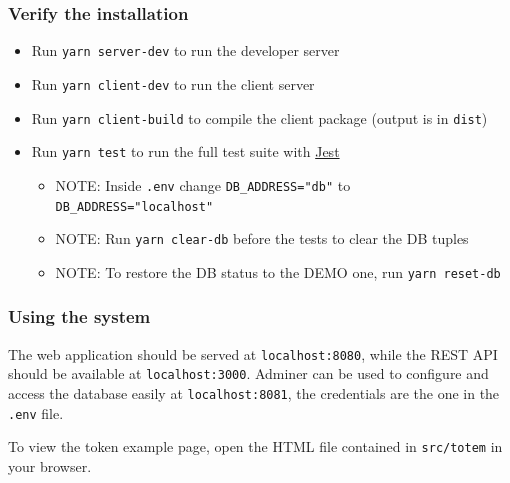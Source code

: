 \documentclass[
]{article}
\begin{document}
\hypertarget{verify-the-installation}{%
\subsubsection{Verify the installation}\label{verify-the-installation}}

\begin{itemize}

\item
  Run \texttt{yarn\ server-dev} to run the developer server
\item
  Run \texttt{yarn\ client-dev} to run the client server
\item
  Run \texttt{yarn\ client-build} to compile the client package (output
  is in \texttt{dist})
\item
  Run \texttt{yarn\ test} to run the full test suite with
  \href{https://jestjs.io}{Jest}
  \begin{itemize}
    \item   NOTE: Inside \texttt{.env} change \texttt{DB\_ADDRESS="db"} to \texttt{DB\_ADDRESS="localhost"}
    \item   NOTE: Run \texttt{yarn\ clear-db} before the tests to clear the DB tuples
    \item   NOTE: To restore the DB status to the DEMO one, run \texttt{yarn\ reset-db}
  \end{itemize}
\end{itemize}

\subsubsection{Using the system}
The web application should be served at \texttt{localhost:8080}, while the REST API should be available at \texttt{localhost:3000}. Adminer can be used to configure and access the database easily at \texttt{localhost:8081}, the credentials are the one in the \texttt{.env} file.

To view the token example page, open the HTML file contained in \texttt{src/totem} in your browser.
\end{document}
